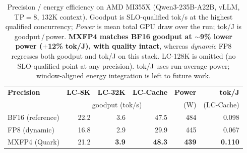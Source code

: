 \begin{table}[t]
  \centering
  \small
  \begin{tabular}{@{}l r r r r r@{}}
    \toprule
    \textbf{Precision} & \textbf{LC-8K} & \textbf{LC-32K} & \textbf{LC-Cache} & \textbf{Power} & \textbf{tok/J} \\
     & \multicolumn{3}{c}{goodput (tok/s)} & (W) & (LC-Cache) \\
    \midrule
    BF16 (reference) & 22.2 & 3.6 & 47.5 & 484 & 0.098 \\
    FP8 (dynamic)    & 16.8 & 2.9 & 29.9 & 445 & 0.067 \\
    MXFP4 (Quark)    & 21.2 & \textbf{3.9} & \textbf{48.3} & \textbf{439} & \textbf{0.110} \\
    \bottomrule
  \end{tabular}
  \caption{Precision / energy efficiency on AMD MI355X (Qwen3-235B-A22B, vLLM,
  TP$=$8, 132K context). Goodput is SLO-qualified tok/s at the highest qualified
  concurrency; \emph{Power} is mean total GPU draw over the run; tok/J is
  goodput\,/\,power. \textbf{MXFP4 matches BF16 goodput at $\sim$9\% lower power
  ($+$12\% tok/J), with quality intact}, whereas \emph{dynamic} FP8 regresses
  both goodput and tok/J on this stack. LC-128K is omitted (no SLO-qualified
  point at any precision). tok/J uses run-average power; window-aligned energy
  integration is left to future work.}
  \label{tab:precision-mi355x}
\end{table}

